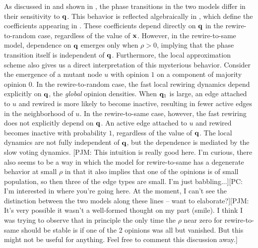 \documentclass[review, onefignum, onetabnum]{siamart171218}
\newcommand{\pjm}[1]{{\color{blue}[PJM: #1]}}
\newcommand{\pc}[1]{{\color{comment_purple}[PC: #1]}}
\begin{document}
		As discussed in \cite{Durrett2012} and shown in , the phase transitions in the two models differ in their sensitivity to $\mathbf{q}$. 
		This behavior is reflected algebraically in , which define the coefficients appearing in . 
		These coefficients depend directly on $\mathbf{q}$ in the rewire-to-random case, regardless of the value of $\mathbf{x}$. 
		However,  in the rewire-to-same model, dependence on $\mathbf{q}$ emerges only when $\rho > 0$, implying that the phase transition itself is independent of $\mathbf{q}$. 
		Furthermore, the local approximation scheme also gives us a direct interpretation of this mysterious behavior. 
		Consider the emergence of a mutant node $u$ with opinion $1$ on a component of majority opinion $0$. 
		In the rewire-to-random case, the fast local rewiring dynamics depend explicitly on $\mathbf{q}$, the \emph{global} opinion densities. 
		When $\mathbf{q}_1$ is large, an edge attached to $u$ and rewired is more likely to become inactive, resulting in fewer active edges in the neighborhood of $u$. 
		In the rewire-to-same case, however, the fast rewiring does not explicitly depend on $\mathbf{q}$. 
		An active edge attached to $u$ and rewired becomes inactive with probability $1$, regardless of the value of $\mathbf{q}$. 
		The local dynamics are not fully independent of $\mathbf{q}$, but the dependence is mediated by the slow voting dynamics. 
		 \pjm{This intuition is really good here. I'm curious, there also seems to be a way in which the model for rewire-to-same has a degenerate behavior at small $\rho$ in that it also implies that one of the opinions is of small population, so then three of the edge types are small. I'm just babbling...}\pc{I'm interested in where you're going here. At the moment, I can't see the distinction between the two models along these lines -- want to elaborate?}\pjm{It's very possible it wasn't a well-formed thought on my part (smile). I think I was trying to observe that in principle the only time the $\rho$ near zero for rewire-to-same should be stable is if one of the 2 opinions was all but vanished. But this might not be useful for anything. Feel free to comment this discussion away.}
	
\end{document}
